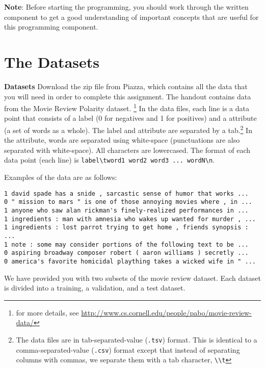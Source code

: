 \documentclass[11pt,addpoints,answers]{exam}
\begin{document}
\textbf{Note}: Before starting the programming, you should work through the written component to get a good understanding of important concepts that are useful for this programming component. 

\section{The Datasets}\label{dataset}


  {\bf Datasets } 
 Download the zip file from Piazza, which contains all the data that you will need in order to complete this assignment.
  The handout contains data from the Movie Review Polarity dataset. \footnote{for more details, see \url{http://www.cs.cornell.edu/people/pabo/movie-review-data/}} In the data files, each line is a data point that consists of a label (0 for negatives and 1 for positives) and a attribute (a set of words as a whole). The label and attribute are separated by a tab.\footnote{The data files are in tab-separated-value (\lstinline{.tsv}) format. This is identical to a comma-separated-value (\lstinline{.csv}) format except that instead of separating columns with commas, we separate them with a tab character, \lstinline{\\t}} In the attribute, words are separated using white-space (punctuations are also separated with white-space). All characters are lowercased. The format of each data point (each line) is \lstinline{label\tword1 word2 word3 ... wordN\n}.

Examples of the data are as follows:
 
\begin{lstlisting}
1 david spade has a snide , sarcastic sense of humor that works ... 
0 " mission to mars " is one of those annoying movies where , in ...
1 anyone who saw alan rickman's finely-realized performances in ...
1 ingredients : man with amnesia who wakes up wanted for murder , ...
1 ingredients : lost parrot trying to get home , friends synopsis : ... 
1 note : some may consider portions of the following text to be ...
0 aspiring broadway composer robert ( aaron williams ) secretly ...
0 america's favorite homicidal plaything takes a wicked wife in " ...
\end{lstlisting}

We have provided you with two subsets of the movie review dataset. Each dataset is divided into a training, a validation, and a test dataset.
\end{document}
